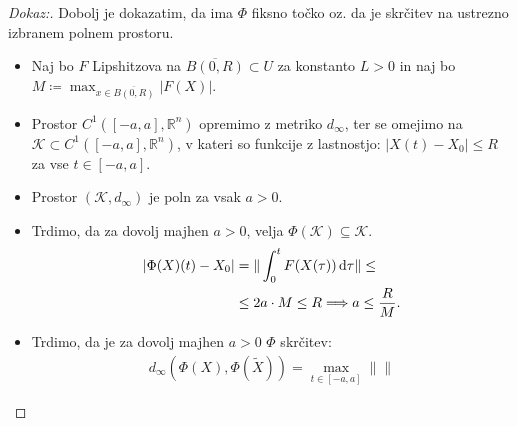 \documentclass{article}
\newcommand{\R}{\mathbb{R}}
\begin{document}
\begin{proof}[Dokaz:]
Dobolj je dokazatim, da ima $\Phi$ fiksno točko oz. da je skrčitev 
na ustrezno izbranem polnem prostoru. 
\begin{itemize}
    \item Naj bo $F$ Lipshitzova na $\overline{B(0, R)} \subset U$
    za konstanto $L>0$ in naj bo $M \coloneqq \max_{x\in\overline{B(0, R)}} |F(X)|$.
    \item Prostor $C^1([-a, a], \R^n)$ opremimo z metriko $d_\infty$, 
    ter se omejimo na $\mathcal{K} \subset C^1([-a, a], \R^n)$, v 
    kateri so funkcije z lastnostjo: $|X(t) - X_0| \leq R$
    za vse $t\in [-a, a]$.
    \item Prostor $(\mathcal{K}, d_\infty)$ je poln za vsak $a>0$. 
    \item Trdimo, da za dovolj majhen $a>0$, velja $\Phi(\mathcal{K}) \subseteq \mathcal{K}$.
    \begin{align*}
    |\Phi(X)(t) - X_0| &= \| \int_0^t F(X(\tau)) \dif \tau \| \leq \\
                       &\leq 2a\cdot M\leq R \Longrightarrow a \leq \frac{R}{M}.
    \end{align*}
    \item Trdimo, da je za dovolj majhen $a>0$ $\Phi$ skrčitev:
    \begin{align*}
    d_\infty(\Phi(X), \Phi(\tilde{X})) = \max_{t\in [-a, a]} \|\|
    \end{align*}
\end{itemize}


\end{proof}
\end{document}
